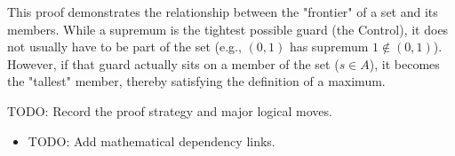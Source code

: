 \begin{remark*}[Interpretation]
This proof demonstrates the relationship between the "frontier" of a set and its members. While a supremum is the tightest possible guard (the Control), it does not usually have to be part of the set (e.g., $(0, 1)$ has supremum $1 \notin (0,1)$). However, if that guard actually sits on a member of the set ($s \in A$), it becomes the "tallest" member, thereby satisfying the definition of a maximum.
\end{remark*}

\begin{remark*}
TODO: Record the proof strategy and major logical moves.
\end{remark*}

\begin{dependencies}
\begin{itemize}
  \item TODO: Add mathematical dependency links.
\end{itemize}
\end{dependencies}
